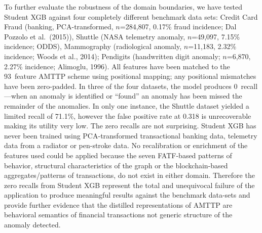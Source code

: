 \documentclass[journal]{IEEEtran}
\begin{document}
To further evaluate the robustness of the domain boundaries, we have tested Student XGB against four completely different benchmark data sets: Credit Card Fraud (banking, PCA-transformed, $n$=284,807, 0.17\% fraud incidence; Dal Pozzolo et al.\ (2015)), Shuttle (NASA telemetry anomaly, $n$=49,097, 7.15\% incidence; ODDS), Mammography (radiological anomaly, $n$=11,183, 2.32\% incidence; Woods et al., 2014); Pendigits (handwritten digit anomaly; $n$=6,870, 2.27\% incidence; Alimoglu, 1996). All features have been matched to the 93~feature AMTTP scheme using positional mapping; any positional mismatches have been zero-padded. In three of the four datasets, the model produces 0~recall---when an anomaly is identified or ``found'' an anomaly has been missed the remainder of the anomalies. In only one instance, the Shuttle dataset yielded a limited recall of 71.1\%, however the false positive rate at 0.318 is unrecoverable making its utility very low. The zero recalls are not surprising. Student XGB has never been trained using PCA-transformed transactional banking data, telemetry data from a radiator or pen-stroke data. No recalibration or enrichment of the features used could be applied because the seven FATF-based patterns of behavior, structural characteristics of the graph or the blockchain-based aggregates/patterns of transactions, do not exist in either domain. Therefore the zero recalls from Student XGB represent the total and unequivocal failure of the application to produce meaningful results against the benchmark data-sets and provide further evidence that the distilled representations of AMTTP are behavioral semantics of financial transactions not generic structure of the anomaly detected.
\end{document}
